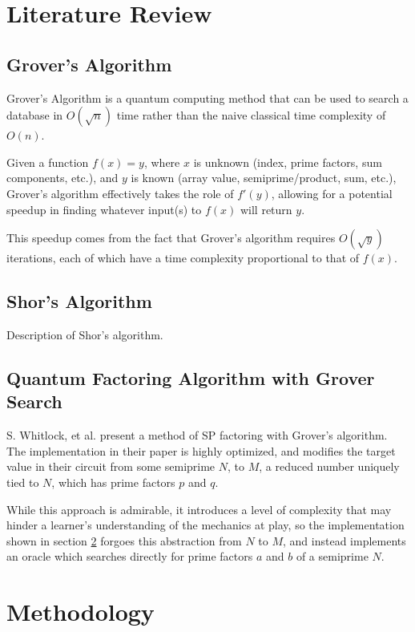 \documentclass[twocolumn]{cinc}
\begin{document}
\section{Literature Review}

  \subsection{Grover's Algorithm}

  Grover's Algorithm is a quantum computing method 
  that can be used to search a database in $O(\sqrt{n})$ time 
  rather than the naive classical time complexity of $O(n)$\cite{grover}. 
  
  Given a function $f(x)=y$, where $x$ is unknown (index, prime factors, 
  sum components, etc.), and $y$ is known (array value, semiprime/product, 
  sum, etc.), Grover's algorithm effectively takes the role of $f'(y)$, 
  allowing for a potential speedup in finding whatever input(s) to $f(x)$
  will return $y$.

  This speedup comes from the fact that Grover's algorithm requires 
  $O(\sqrt{y})$ iterations, each of which have a time complexity proportional
  to that of $f(x)$.

  \subsection{Shor's Algorithm}

  Description of Shor's algorithm.

  \subsection{Quantum Factoring Algorithm with Grover Search}

  S. Whitlock, et al. present a method of SP factoring with Grover's
  algorithm. The implementation in their paper is highly optimized,
  and modifies the target value in their circuit from some semiprime $N$,
  to $M$, a reduced number uniquely tied to $N$, which has prime factors
  $p$ and $q$. 

  While this approach is admirable, it introduces a level of complexity 
  that may hinder a learner's understanding of the mechanics at play,
  so the implementation shown in section \ref{sec:Methodology} forgoes
  this abstraction from $N$ to $M$, and instead implements an oracle which
  searches directly for prime factors $a$ and $b$ of a semiprime $N$.

\section{Methodology} \label{sec:Methodology}
\end{document}
